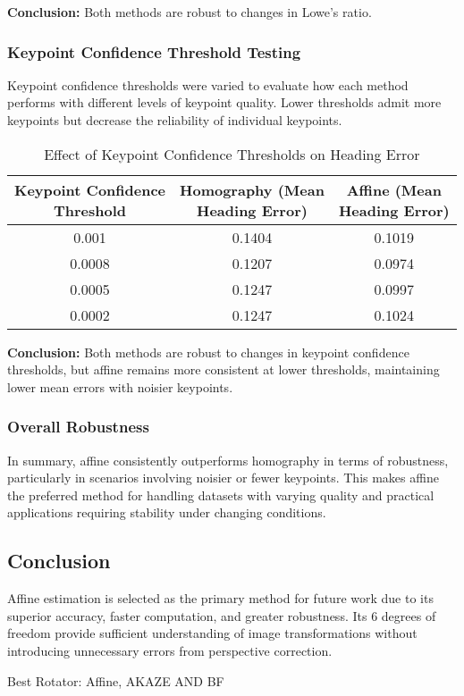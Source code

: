\textbf{Conclusion:} Both methods are robust to changes in Lowe’s ratio. 

\subsubsection{Keypoint Confidence Threshold Testing}
Keypoint confidence thresholds were varied to evaluate how each method performs with different levels of keypoint quality. Lower thresholds admit more keypoints but decrease the reliability of individual keypoints.

\begin{table}[H]
    \centering
    \begin{tabular}{|c|c|c|}
        \hline
        \makecell{\textbf{Keypoint Confidence} \\ \textbf{Threshold}} & \makecell{\textbf{Homography (Mean} \\ \textbf{Heading Error)}} & \makecell{\textbf{Affine (Mean} \\ \textbf{Heading Error)}}\\
        \hline
        0.001 & 0.1404 & 0.1019 \\  
        0.0008 & 0.1207 & 0.0974 \\  
        0.0005 & 0.1247 & 0.0997 \\  
        0.0002 & 0.1247 & 0.1024 \\  
        \hline
    \end{tabular}
    \caption{Effect of Keypoint Confidence Thresholds on Heading Error}
\end{table}

\textbf{Conclusion:} Both methods are robust to changes in keypoint confidence thresholds, but affine remains more consistent at lower thresholds, maintaining lower mean errors with noisier keypoints.

\subsubsection{Overall Robustness}
In summary, affine consistently outperforms homography in terms of robustness, particularly in scenarios involving noisier or fewer keypoints. This makes affine the preferred method for handling datasets with varying quality and practical applications requiring stability under changing conditions.

\subsection{Conclusion}
Affine estimation is selected as the primary method for future work due to its superior accuracy, faster computation, and greater robustness. Its 6 degrees of freedom provide sufficient understanding of image transformations without introducing unnecessary errors from perspective correction. 


Best Rotator: Affine, AKAZE AND BF